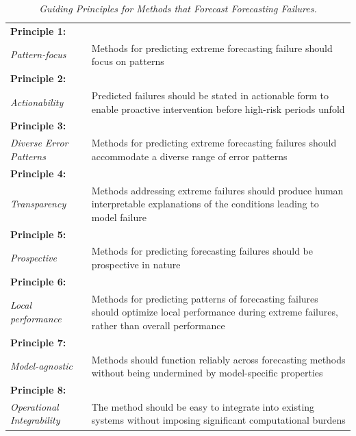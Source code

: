 \documentclass[ijds,sglanonrev]{informs4}
\begin{document}
\begin{table}[b]
\centering
\caption{\textit{Guiding Principles for Methods that Forecast Forecasting Failures.}}
\small
\renewcommand{\arraystretch}{1.5}
\begin{tabular}{|m{2.5cm}|m{12.5cm}|}
\hline
\centering\textbf{Principle 1:} \\ \centering\textit{Pattern-focus} & Methods for predicting extreme forecasting failure should focus on patterns \\
\hline
\centering\textbf{Principle 2:} \\ \centering\textit{Actionability} & Predicted failures should be stated in actionable form to enable proactive intervention before high-risk periods unfold \\
\hline
\centering\textbf{Principle 3:} \\ \centering\textit{Diverse Error Patterns} & Methods for predicting extreme forecasting failures should accommodate a diverse range of error patterns \\
\hline
\centering\textbf{Principle 4:} \\ \centering\textit{Transparency} & Methods addressing extreme failures should produce human interpretable explanations of the conditions leading to model failure \\
\hline
\centering\textbf{Principle 5:} \\ \centering\textit{Prospective} & Methods for predicting forecasting failures should be prospective in nature \\
\hline
\centering\textbf{Principle 6:} \\ \centering\textit{Local performance} & Methods for predicting patterns of forecasting failures should optimize local performance during extreme failures, rather than overall performance \\
\hline
\centering\textbf{Principle 7:} \\ \centering\textit{Model-agnostic} & Methods should function reliably across forecasting methods without being undermined by model-specific properties \\
\hline
\centering\textbf{Principle 8:} \\ \centering\textit{Operational Integrability} & The method should be easy to integrate into existing  systems without imposing significant computational burdens \\
\hline
\end{tabular}
\label{tab:principles}
\end{table}
\end{document}
